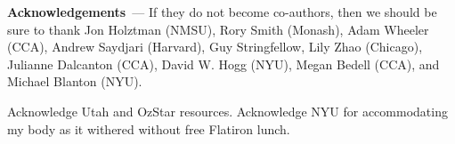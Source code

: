 \documentclass[modern]{aastex631}
\renewcommand{\paragraph}[1]{\medskip\par\noindent\textbf{#1}~---}
\newcommand{\todo}[1]{\textcolor{tab:red}{#1}}
\begin{document}
\paragraph{Acknowledgements}
If they do not become co-authors, then we should be sure to thank
    Jon Holztman (NMSU),
    Rory Smith (Monash),
    Adam Wheeler (CCA),
    Andrew Saydjari (Harvard),
    Guy Stringfellow,
    Lily Zhao (Chicago),
    Julianne Dalcanton (CCA),
    David W. Hogg (NYU),
    Megan Bedell (CCA), and
    Michael Blanton (NYU).

\todo{Acknowledge Utah and OzStar resources. Acknowledge NYU for accommodating my body as it withered without free Flatiron lunch.}

%
\end{document}
